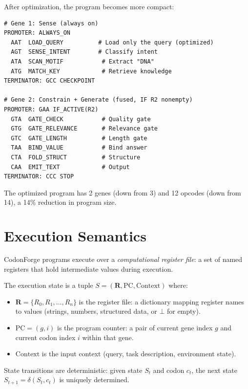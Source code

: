 \noindent After optimization, the program becomes more compact:

\begin{lstlisting}[style=dogmapython, caption={Optimized codon program for ``What is DNA?''.}]
# Gene 1: Sense (always on)
PROMOTER: ALWAYS_ON
  AAT  LOAD_QUERY          # Load only the query (optimized)
  AGT  SENSE_INTENT        # Classify intent
  ATA  SCAN_MOTIF           # Extract "DNA"
  ATG  MATCH_KEY            # Retrieve knowledge
TERMINATOR: GCC CHECKPOINT

# Gene 2: Constrain + Generate (fused, IF R2 nonempty)
PROMOTER: GAA IF_ACTIVE(R2)
  GTA  GATE_CHECK           # Quality gate
  GTG  GATE_RELEVANCE       # Relevance gate
  GTC  GATE_LENGTH          # Length gate
  TAA  BIND_VALUE           # Bind answer
  CTA  FOLD_STRUCT          # Structure
  CAA  EMIT_TEXT            # Output
TERMINATOR: CCC STOP
\end{lstlisting}

The optimized program has 2 genes (down from 3) and 12 opcodes (down from 14), a 14\% reduction in program size.


\section{Execution Semantics}
\label{sec:execution-semantics}

CodonForge programs execute over a \emph{computational register file}: a set of named registers that hold intermediate values during execution.

\begin{definition}
\label{def:exec-state}
The execution state is a tuple $S = (\mathbf{R}, \text{PC}, \text{Context})$ where:
\begin{itemize}[leftmargin=1.5em]
  \item $\mathbf{R} = \{R_0, R_1, \ldots, R_n\}$ is the register file: a dictionary mapping register names to values (strings, numbers, structured data, or $\bot$ for empty).
  \item $\text{PC} = (g, i)$ is the program counter: a pair of current gene index $g$ and current codon index $i$ within that gene.
  \item $\text{Context}$ is the input context (query, task description, environment state).
\end{itemize}
State transitions are deterministic: given state $S_t$ and codon $c_t$, the next state $S_{t+1} = \delta(S_t, c_t)$ is uniquely determined.
\end{definition}


